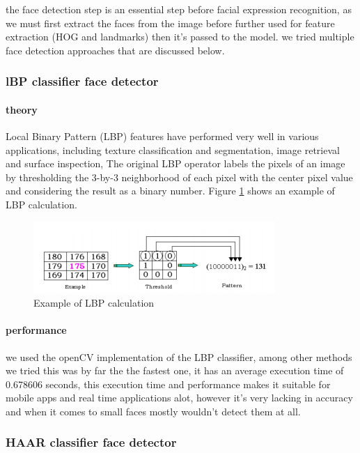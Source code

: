 the face detection step is an essential step before facial expression recognition, as we must first extract the faces from the image before further used for feature extraction (HOG and landmarks) then it's passed to the model.
\newline
we tried multiple face detection approaches that are discussed below.
\subsubsection{lBP classifier face detector}

\paragraph{theory}
Local Binary Pattern (LBP) features have performed very well in various applications, including texture classification and segmentation, image retrieval and surface inspection, The original LBP operator labels the pixels of an image by thresholding the 3-by-3 neighborhood of each pixel with the
center pixel value and considering the result as a binary number.
Figure \ref{fig:LBP_calculation} shows an example of LBP calculation. 

\begin{figure}
	\centering
	\includegraphics{images/LBP_classifier.png}
	\caption{Example of LBP calculation}
	\label{fig:LBP_calculation}
\end{figure}

\paragraph{performance}
we used the openCV implementation of the LBP classifier, among other methods we tried this was by far the the fastest one, it has an average execution time of 0.678606 seconds, this execution time and performance makes it suitable for mobile apps and real time applications alot, however it's very lacking in accuracy and when it comes to small faces mostly wouldn't detect them at all. 



\subsubsection{HAAR classifier face detector}

